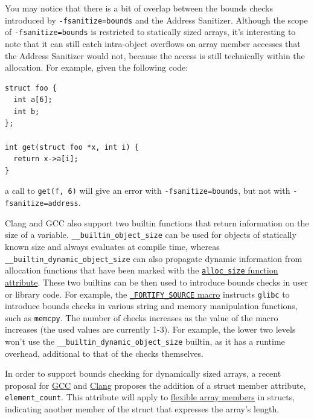 \documentclass[
  a4paper,
]{report}
\begin{document}
You may notice that there is a bit of overlap between the bounds checks
introduced by \texttt{-fsanitize=bounds} and the Address Sanitizer.
Although the scope of \texttt{-fsanitize=bounds} is restricted to
statically sized arrays, it's interesting to note that it can still
catch \label{__index_entry_89}{intra-object
overflows} on array member accesses that
the Address Sanitizer would not, because the access is still technically
within the allocation. For example, given the following code:

\begin{verbatim}
struct foo {
  int a[6];
  int b;
};

int get(struct foo *x, int i) {
  return x->a[i];
}
\end{verbatim}

a call to \texttt{get(f,\ 6)} will give an error with
\texttt{-fsanitize=bounds}, but not with \texttt{-fsanitize=address}.

Clang and GCC also support two builtin functions that return information
on the size of a variable. \texttt{\_\_builtin\_object\_size} can be
used for objects of statically known size and always evaluates at
compile time, whereas \texttt{\_\_builtin\_dynamic\_object\_size} can
also propagate dynamic information from allocation functions that have
been marked with the
\href{https://gcc.gnu.org/onlinedocs/gcc-4.7.2/gcc/Function-Attributes.html}{\texttt{alloc\_size}
function attribute}. These two builtins can be then used to introduce
bounds checks in user or library code. For example, the
\href{https://man7.org/linux/man-pages/man7/feature_test_macros.7.html}{\texttt{\_FORTIFY\_SOURCE}
macro} instructs \texttt{glibc} to introduce bounds checks in various
string and memory manipulation functions, such as \texttt{memcpy}. The
number of checks increases as the value of the macro increases (the used
values are currently 1-3). For example, the lower two levels won't use
the \texttt{\_\_builtin\_dynamic\_object\_size} builtin, as it has a
runtime overhead, additional to that of the checks themselves.

In order to support bounds checking for dynamically sized arrays, a
recent proposal for
\href{https://gcc.gnu.org/bugzilla/show_bug.cgi?id=108896}{GCC} and
\href{https://reviews.llvm.org/D148381}{Clang} proposes the addition of
a struct member attribute, \texttt{element\_count}. This attribute will
apply to
\href{https://en.wikipedia.org/wiki/Flexible_array_member}{flexible
array members} in structs, indicating another member of the struct that
expresses the array's length.
\end{document}
